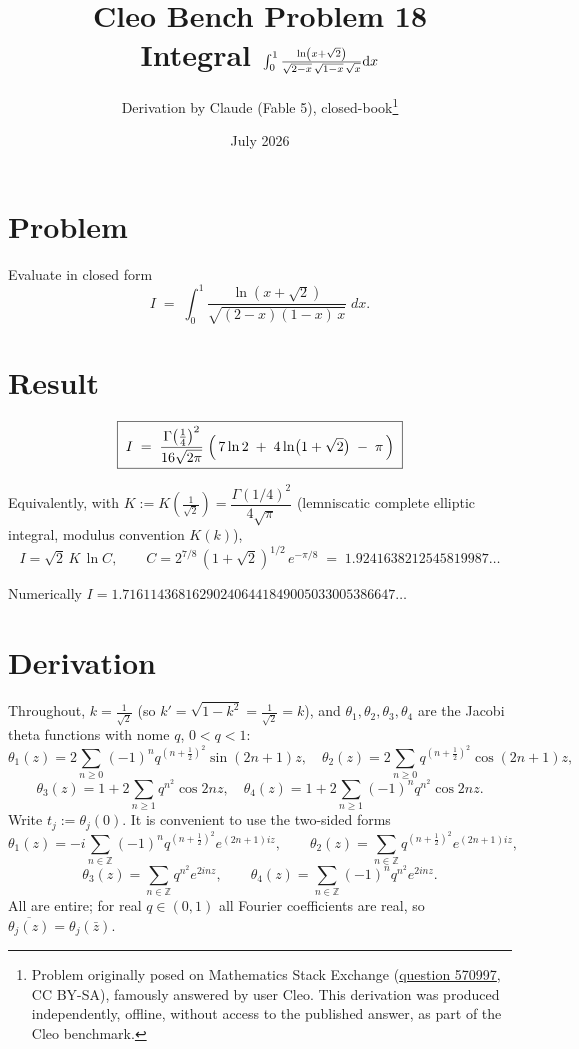 \documentclass[11pt]{article}
\title{Cleo Bench Problem 18\\[1ex]\large Integral $\int_0^1\frac{\ln\left(x+\sqrt2\right)}{\sqrt{2-x}\,\sqrt{1-x}\,\sqrt{\vphantom{1}x}}\mathrm dx$}
\author{Derivation by Claude (Fable 5), closed-book\thanks{Problem originally
posed on Mathematics Stack Exchange
(\href{https://math.stackexchange.com/q/570997}{question 570997}, CC BY-SA),
famously answered by user Cleo. This derivation was produced independently,
offline, without access to the published answer, as part of the Cleo benchmark.}}
\date{July 2026}
\theoremstyle{remark}
\begin{document}
\maketitle

\section*{Problem}

Evaluate in closed form
\[I \;=\; \int_0^1\frac{\ln\left(x+\sqrt2\right)}{\sqrt{(2-x)(1-x)\,x}}\;dx .\]

\section*{Result}

\[\boxed{\;I \;=\; \frac{\Gamma\!\left(\tfrac14\right)^2}{16\sqrt{2\pi}}\;\Bigl(\,7\ln 2 \;+\; 4\ln\bigl(1+\sqrt2\bigr)\;-\;\pi\,\Bigr)\;}\]

Equivalently, with $K:=K\!\left(\tfrac1{\sqrt2}\right)=\dfrac{\Gamma(1/4)^2}{4\sqrt\pi}$ (lemniscatic complete elliptic integral, modulus convention $K(k)$),
\[I=\sqrt2\,K\,\ln C,\qquad C=2^{7/8}\,(1+\sqrt2)^{1/2}\,e^{-\pi/8}\;=\;1.9241638212545819987\ldots\]

Numerically $I = 1.716114368162902406441849005033005386647\ldots$

\section*{Derivation}

Throughout, $k=\tfrac1{\sqrt2}$ (so $k'=\sqrt{1-k^2}=\tfrac1{\sqrt2}=k$), and $\theta_1,\theta_2,\theta_3,\theta_4$ are the Jacobi theta functions with nome $q$, $0<q<1$:
\[\theta_1(z)=2\sum_{n\ge0}(-1)^nq^{(n+\frac12)^2}\sin(2n{+}1)z,\quad
\theta_2(z)=2\sum_{n\ge0}q^{(n+\frac12)^2}\cos(2n{+}1)z,\]
\[\theta_3(z)=1+2\sum_{n\ge1}q^{n^2}\cos 2nz,\quad
\theta_4(z)=1+2\sum_{n\ge1}(-1)^nq^{n^2}\cos 2nz .\]
Write $t_j:=\theta_j(0)$. It is convenient to use the two-sided forms
\[\theta_1(z)=-i\sum_{n\in\mathbb Z}(-1)^nq^{(n+\frac12)^2}e^{(2n+1)iz},\qquad
\theta_2(z)=\sum_{n\in\mathbb Z}q^{(n+\frac12)^2}e^{(2n+1)iz},\]
\[\theta_3(z)=\sum_{n\in\mathbb Z}q^{n^2}e^{2inz},\qquad
\theta_4(z)=\sum_{n\in\mathbb Z}(-1)^nq^{n^2}e^{2inz}.\]
All are entire; for real $q\in(0,1)$ all Fourier coefficients are real, so $\overline{\theta_j(z)}=\theta_j(\bar z)$.
\end{document}
